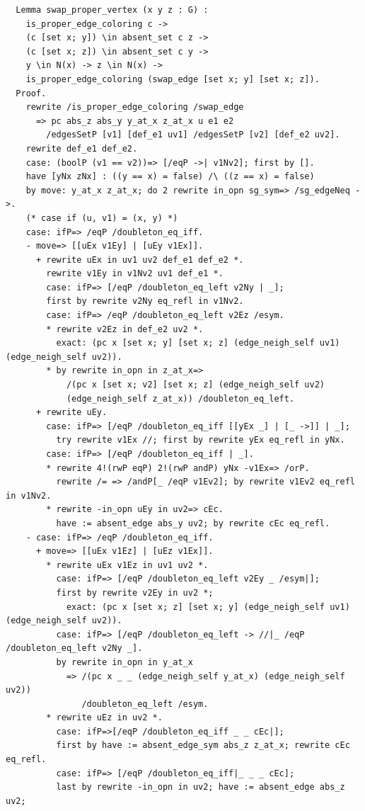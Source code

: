 \begin{verbatim}
  Lemma swap_proper_vertex (x y z : G) :
    is_proper_edge_coloring c ->
    (c [set x; y]) \in absent_set c z ->
    (c [set x; z]) \in absent_set c y ->
    y \in N(x) -> z \in N(x) ->
    is_proper_edge_coloring (swap_edge [set x; y] [set x; z]).
  Proof.
    rewrite /is_proper_edge_coloring /swap_edge
      => pc abs_z abs_y y_at_x z_at_x u e1 e2  
        /edgesSetP [v1] [def_e1 uv1] /edgesSetP [v2] [def_e2 uv2].
    rewrite def_e1 def_e2.
    case: (boolP (v1 == v2))=> [/eqP ->| v1Nv2]; first by [].
    have [yNx zNx] : ((y == x) = false) /\ ((z == x) = false) 
    by move: y_at_x z_at_x; do 2 rewrite in_opn sg_sym=> /sg_edgeNeq ->.
    (* case if (u, v1) = (x, y) *)
    case: ifP=> /eqP /doubleton_eq_iff.
    - move=> [[uEx v1Ey] | [uEy v1Ex]].
      + rewrite uEx in uv1 uv2 def_e1 def_e2 *.
        rewrite v1Ey in v1Nv2 uv1 def_e1 *.
        case: ifP=> [/eqP /doubleton_eq_left v2Ny | _]; 
        first by rewrite v2Ny eq_refl in v1Nv2.
        case: ifP=> /eqP /doubleton_eq_left v2Ez /esym.
        * rewrite v2Ez in def_e2 uv2 *.
          exact: (pc x [set x; y] [set x; z] (edge_neigh_self uv1) (edge_neigh_self uv2)).
        * by rewrite in_opn in z_at_x=>   
            /(pc x [set x; v2] [set x; z] (edge_neigh_self uv2) 
            (edge_neigh_self z_at_x)) /doubleton_eq_left.
      + rewrite uEy.
        case: ifP=> [/eqP /doubleton_eq_iff [[yEx _] | [_ ->]] | _];
          try rewrite v1Ex //; first by rewrite yEx eq_refl in yNx.
        case: ifP=> [/eqP /doubleton_eq_iff | _].
        * rewrite 4!(rwP eqP) 2!(rwP andP) yNx -v1Ex=> /orP. 
          rewrite /= => /andP[_ /eqP v1Ev2]; by rewrite v1Ev2 eq_refl in v1Nv2.
        * rewrite -in_opn uEy in uv2=> cEc.
          have := absent_edge abs_y uv2; by rewrite cEc eq_refl.
    - case: ifP=> /eqP /doubleton_eq_iff.
      + move=> [[uEx v1Ez] | [uEz v1Ex]].
        * rewrite uEx v1Ez in uv1 uv2 *.
          case: ifP=> [/eqP /doubleton_eq_left v2Ey _ /esym|];
          first by rewrite v2Ey in uv2 *; 
            exact: (pc x [set x; z] [set x; y] (edge_neigh_self uv1) (edge_neigh_self uv2)).
          case: ifP=> [/eqP /doubleton_eq_left -> //|_ /eqP /doubleton_eq_left v2Ny _].
          by rewrite in_opn in y_at_x
            => /(pc x _ _ (edge_neigh_self y_at_x) (edge_neigh_self uv2)) 
               /doubleton_eq_left /esym.
        * rewrite uEz in uv2 *.
          case: ifP=>[/eqP /doubleton_eq_iff _ _ cEc|];
          first by have := absent_edge_sym abs_z z_at_x; rewrite cEc eq_refl.
          case: ifP=> [/eqP /doubleton_eq_iff|_ _ _ cEc];
          last by rewrite -in_opn in uv2; have := absent_edge abs_z uv2; 

\end{verbatim}
